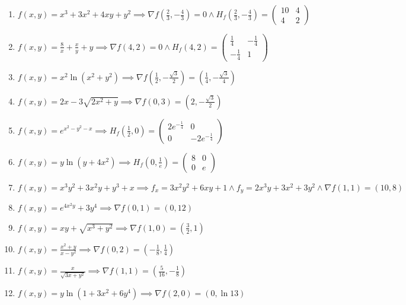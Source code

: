 \documentclass[11pt,a4paper]{article}
\begin{document}
\begin{enumerate}
\item $\displaystyle f(x, y) = x^{3} + 3x^{2} + 4xy + y^{2} \implies \nabla f\left( \frac{2}{3}, -\frac{4}{3} \right) = 0 \land H_{f}\left( \frac{2}{3}, -\frac{4}{3} \right) = \begin{pmatrix} 10 & 4 \\ 4 & 2 \end{pmatrix}$
\item $\displaystyle f(x, y) = \frac{8}{x} + \frac{x}{y} + y \implies \nabla f(4, 2) = 0 \land H_{f}(4, 2) = \begin{pmatrix} \frac{1}{4} & -\frac{1}{4} \\ -\frac{1}{4} & 1 \end{pmatrix}$
\item $\displaystyle f(x, y) = x^{2} \ln(x^{2} + y^{2}) \implies \nabla f\left( \frac{1}{2}, -\frac{\sqrt{3}}{2} \right) = \left( \frac{1}{4}, -\frac{\sqrt{3}}{4} \right)$
\item $\displaystyle f(x, y) = 2x - 3\sqrt{2x^{2} + y} \implies \nabla f(0, 3) = \left( 2, -\frac{\sqrt{3}}{2} \right)$
\item $\displaystyle f(x, y) = e^{x^{2} - y^{2} - x} \implies H_{f}\left( \frac{1}{2}, 0 \right) = \begin{pmatrix} 2e^{-\frac{1}{4}} & 0 \\ 0 & -2e^{-\frac{1}{4}} \end{pmatrix}$
\item $\displaystyle f(x, y) = y \ln(y + 4x^{2}) \implies H_{f}\left( 0, \frac{1}{e} \right) = \begin{pmatrix} 8 & 0 \\ 0 & e \end{pmatrix}$
\item $\displaystyle f(x, y) = x^{3} y^{2} + 3x^{2} y + y^{3} + x \implies f_{x} = 3x^{2} y^{2} + 6xy + 1 \land f_{y} = 2x^{3} y + 3x^{2} + 3y^{2} \land \nabla f(1, 1) = (10, 8)$
\item $\displaystyle f(x, y) = e^{4x^{2} y} + 3y^{4} \implies \nabla f(0, 1) = (0, 12)$
\item $\displaystyle f(x, y) = xy + \sqrt{x^{3} + y^{2}} \implies \nabla f(1, 0) = \left( \frac{3}{2}, 1 \right)$
\item $\displaystyle f(x, y) = \frac{x^{2} + y}{x - y^{2}} \implies \nabla f(0, 2) = \left( -\frac{1}{8}, \frac{1}{4} \right)$
\item $\displaystyle f(x, y) = \frac{x}{\sqrt{3x + y^{2}}} \implies \nabla f(1, 1) = \left( \frac{5}{16}, -\frac{1}{8} \right)$
\item $\displaystyle f(x, y) = y \ln(1 + 3x^{2} + 6y^{4}) \implies \nabla f(2, 0) = (0, \ln 13)$

\end{enumerate}
\end{document}
